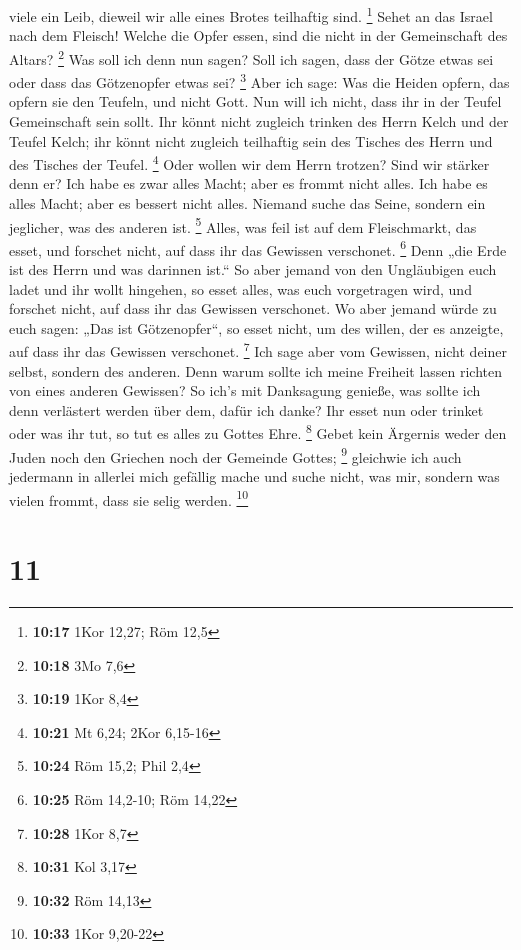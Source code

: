 viele ein Leib, dieweil wir alle eines Brotes teilhaftig sind.
\footnote{\textbf{10:17} 1Kor 12,27; Röm 12,5}  Sehet an
das Israel nach dem Fleisch! Welche die Opfer essen, sind die nicht in
der Gemeinschaft des Altars? \footnote{\textbf{10:18} 3Mo 7,6}
 Was soll ich denn nun sagen? Soll ich sagen, dass der
Götze etwas sei oder dass das Götzenopfer etwas sei? \footnote{\textbf{10:19}
  1Kor 8,4}  Aber ich sage: Was die Heiden opfern, das
opfern sie den Teufeln, und nicht Gott. Nun will ich nicht, dass ihr in
der Teufel Gemeinschaft sein sollt.  Ihr könnt nicht
zugleich trinken des Herrn Kelch und der Teufel Kelch; ihr könnt nicht
zugleich teilhaftig sein des Tisches des Herrn und des Tisches der
Teufel. \footnote{\textbf{10:21} Mt 6,24; 2Kor 6,15-16} 
Oder wollen wir dem Herrn trotzen? Sind wir stärker denn er?
 Ich habe es zwar alles Macht; aber es frommt nicht
alles. Ich habe es alles Macht; aber es bessert nicht alles.
 Niemand suche das Seine, sondern ein jeglicher, was des
anderen ist. \footnote{\textbf{10:24} Röm 15,2; Phil 2,4}
 Alles, was feil ist auf dem Fleischmarkt, das esset, und
forschet nicht, auf dass ihr das Gewissen verschonet. \footnote{\textbf{10:25}
  Röm 14,2-10; Röm 14,22}  Denn „die Erde ist des Herrn
und was darinnen ist.``  So aber jemand von den
Ungläubigen euch ladet und ihr wollt hingehen, so esset alles, was euch
vorgetragen wird, und forschet nicht, auf dass ihr das Gewissen
verschonet.  Wo aber jemand würde zu euch sagen: „Das ist
Götzenopfer``, so esset nicht, um des willen, der es anzeigte, auf dass
ihr das Gewissen verschonet. \footnote{\textbf{10:28} 1Kor 8,7}
 Ich sage aber vom Gewissen, nicht deiner selbst, sondern
des anderen. Denn warum sollte ich meine Freiheit lassen richten von
eines anderen Gewissen?  So ich's mit Danksagung genieße,
was sollte ich denn verlästert werden über dem, dafür ich danke?
 Ihr esset nun oder trinket oder was ihr tut, so tut es
alles zu Gottes Ehre. \footnote{\textbf{10:31} Kol 3,17} 
Gebet kein Ärgernis weder den Juden noch den Griechen noch der Gemeinde
Gottes; \footnote{\textbf{10:32} Röm 14,13}  gleichwie
ich auch jedermann in allerlei mich gefällig mache und suche nicht, was
mir, sondern was vielen frommt, dass sie selig werden. \footnote{\textbf{10:33}
  1Kor 9,20-22}

\hypertarget{section-10}{%
\section{11}\label{section-10}}

